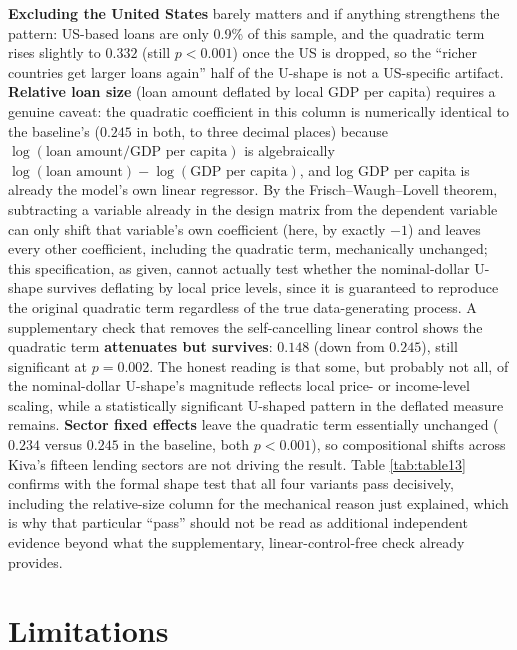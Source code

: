 \documentclass[12pt]{article}
\begin{document}




\textbf{Excluding the United States} barely matters and if anything
strengthens the pattern: US-based loans are only 0.9\% of this sample, and the quadratic term rises
slightly to $0.332$ (still $p<0.001$) once the US is dropped, so the ``richer countries get larger
loans again'' half of the U-shape is not a US-specific artifact. \textbf{Relative loan size} (loan
amount deflated by local GDP per capita) requires a genuine caveat: the quadratic coefficient in this
column is numerically identical to the baseline's ($0.245$ in both, to three decimal places) because
$\log(\text{loan amount}/\text{GDP per capita})$ is algebraically $\log(\text{loan amount}) -
\log(\text{GDP per capita})$, and log GDP per capita is already the model's own linear regressor. By
the Frisch--Waugh--Lovell theorem, subtracting a variable already in the design matrix from the
dependent variable can only shift that variable's own coefficient (here, by exactly $-1$) and leaves
every other coefficient, including the quadratic term, mechanically unchanged; this specification, as
given, cannot actually test whether the nominal-dollar U-shape survives deflating by local price
levels, since it is guaranteed to reproduce the original quadratic term regardless of the true
data-generating process. A supplementary check that removes the self-cancelling linear control shows
the quadratic term \textbf{attenuates but survives}: $0.148$ (down from $0.245$), still significant at
$p=0.002$. The honest reading is that some, but probably not all, of the nominal-dollar U-shape's
magnitude reflects local price- or income-level scaling, while a statistically significant U-shaped
pattern in the deflated measure remains. \textbf{Sector fixed effects} leave the quadratic term
essentially unchanged ($0.234$ versus $0.245$ in the baseline, both $p<0.001$), so compositional
shifts across Kiva's fifteen lending sectors are not driving the result. Table \ref{tab:table13}
confirms with the formal shape test that all four variants pass decisively, including the relative-size
column for the mechanical reason just explained, which is why that particular ``pass'' should not be
read as additional independent evidence beyond what the supplementary, linear-control-free check
already provides.

\section{Limitations}
\label{sec:limitations}
\end{document}
